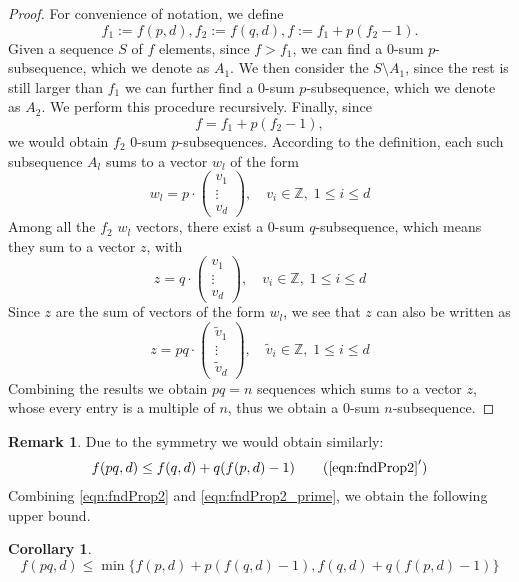\documentclass{article}
\theoremstyle{definition}
\newtheorem{corollary}[theorem]{Corollary}
\newtheorem{remark}[theorem]{Remark}
\numberwithin{equation}{theorem}
\numberwithin{figure}{theorem}
\newcommand{\Integer}{\ensuremath{\mathbb{Z}}}
\newcommand{\zeroSumSeq}[1]{$0$-sum $#1$-subsequence}
\newcommand{\fnd}[2]{\ensuremath{f(#1,#2)}}
\begin{document}
    \begin{proof}
        For convenience of notation, we define 
        \[f_1 := \fnd{p}{d}, f_2 := \fnd{q}{d}, f := f_1 + p(f_2 - 1).\]
        Given a sequence $S$ of $f$ elements, 
        since $f > f_1$, we can find a \zeroSumSeq{p}, 
        which we denote as $A_1$.
        We then consider the $S \setminus A_1$, since 
        the rest is still larger than $f_1$ we can 
        further find a \zeroSumSeq{p}, which we denote 
        as $A_2$.
        We perform this procedure recursively. Finally, 
        since 
        \[f = f_1 + p (f_2 - 1),\]
        we would obtain $f_2$ \zeroSumSeq{p}s. According to the definition, each such subsequence $A_l$ sums to a vector $w_l$ of the form
        \begin{equation*}\label{eqn:fnd_pq_p_sumVec}
            w_l = p \cdot \begin{pmatrix}
            v_1\\
            \vdots\\
            v_d
        \end{pmatrix}, \quad v_i \in \Integer, \; 1 \leq i \leq d
        \end{equation*}
        Among all the $f_2$ $w_l$ vectors, there exist a \zeroSumSeq{q}, which means 
        they sum to a vector $z$, with
        \[z = q \cdot \begin{pmatrix}
            v_1\\
            \vdots\\
            v_d
        \end{pmatrix}, \quad v_i \in \Integer, \; 1 \leq i \leq d\]
        Since $z$ are the sum of vectors of the form $w_l$, we see that $z$ can also be written as
        \[
            z = pq \cdot \begin{pmatrix}
                \tilde{v}_1\\
                \vdots\\
                \tilde{v}_d
            \end{pmatrix}, \quad \tilde{v}_i \in \Integer, \; 1 \leq i \leq d\]
        Combining the results we obtain $pq = n$ sequences which sums to a vector $z$, whose every 
        entry is a multiple of $n$, thus we obtain a \zeroSumSeq{n}.
    \end{proof}
    \begin{remark}
        Due to the symmetry we would obtain similarly:
        \begin{align}\label{eqn:fndProp2_prime}
            \fnd{pq}{d} \leq \fnd{q}{d} + q(\fnd{p}{d} - 1)\tag{$\ref{eqn:fndProp2}^\prime$}
        \end{align}
        Combining \eqref{eqn:fndProp2} and \eqref{eqn:fndProp2_prime}, we obtain the following upper bound.
    \end{remark}
    \begin{corollary}\label{cor:fnd_pq_Bound}
        \begin{equation}\label{eqn:fnd_pq_Bound}
            \fnd{pq}{d} \leq \min \{\fnd{p}{d} + p(\fnd{q}{d} - 1),  \fnd{q}{d} + q(\fnd{p}{d} - 1)\}
        \end{equation}
    \end{corollary}
    
\end{document}
